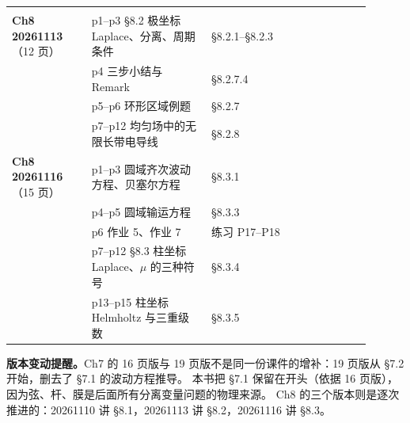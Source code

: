 \begin{center}
\tabtop
\begin{tabular}{@{}L{0.20\linewidth}L{0.30\linewidth}L{0.40\linewidth}@{}}
 &  &  \\
\tabmidrule
\textbf{Ch8 20261113}（12 页） & p1--p3 §8.2 极坐标 Laplace、分离、周期条件 & §8.2.1--§8.2.3 \\
 & p4 三步小结与 Remark & §8.2.7.4 \\
 & p5--p6 环形区域例题 & §8.2.7 \\
 & p7--p12 均匀场中的无限长带电导线 & §8.2.8 \\
\tabmidrule
\textbf{Ch8 20261116}（15 页） & p1--p3 圆域齐次波动方程、贝塞尔方程 & §8.3.1 \\
 & p4--p5 圆域输运方程 & §8.3.3 \\
 & p6 作业 5、作业 7 & 练习 P17--P18 \\
 & p7--p12 §8.3 柱坐标 Laplace、$\mu$ 的三种符号 & §8.3.4 \\
 & p13--p15 柱坐标 Helmholtz 与三重级数 & §8.3.5 \\
\end{tabular}
\tabbot
\end{center}

\textbf{版本变动提醒。}Ch7 的 16 页版与 19 页版不是同一份课件的增补：19 页版从 §7.2 开始，删去了 §7.1 的波动方程推导。
本书把 §7.1 保留在开头（依据 16 页版），因为弦、杆、膜是后面所有分离变量问题的物理来源。
Ch8 的三个版本则是逐次推进的：20261110 讲 §8.1，20261113 讲 §8.2，20261116 讲 §8.3。

